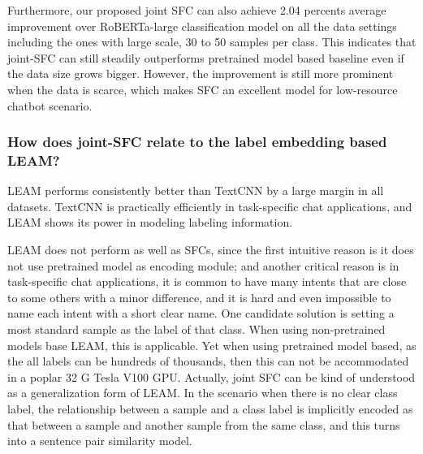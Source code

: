 Furthermore,  our  proposed  joint  SFC can also achieve 2.04 percents average
improvement  over  RoBERTa-large classification model on all the data settings
including  the  ones  with  large  scale,  30  to  50  samples per class. This
indicates that joint-SFC can still steadily outperforms pretrained model based
baseline even if the data size grows bigger. However, the improvement is still
more prominent when the data is scarce, which makes SFC an excellent model for
low-resource chatbot scenario.

\subsubsection*{How does joint-SFC relate to the label  embedding based  LEAM?}
LEAM performs consistently better than TextCNN by a large margin in all
datasets. TextCNN is practically efficiently in task-specific chat
applications, and LEAM shows its power in modeling labeling information.

LEAM  does not perform as well as SFCs, since the first intuitive reason is it
does  not use pretrained model as encoding module; and another critical reason
is  in  task-specific  chat applications, it is common to have many intents
that are close to some others with a minor difference, and it is hard and even
impossible  to  name  each  intent  with  a short clear name. One candidate
solution  is  setting  a most standard sample as the label of that class. When
using  non-pretrained  models  base  LEAM,  this is applicable. Yet when using
pretrained  model  based, as the all labels can be hundreds of thousands, then
this  can not be accommodated in a poplar 32 G Tesla V100 GPU. Actually, joint
SFC  can  be  kind  of  understood  as  a  generalization form of LEAM. In the
scenario when there is no clear class label, the relationship between a sample
and  a class label is implicitly encoded as that between a sample and another
sample  from  the  same  class, and this turns into a sentence pair similarity
model.


